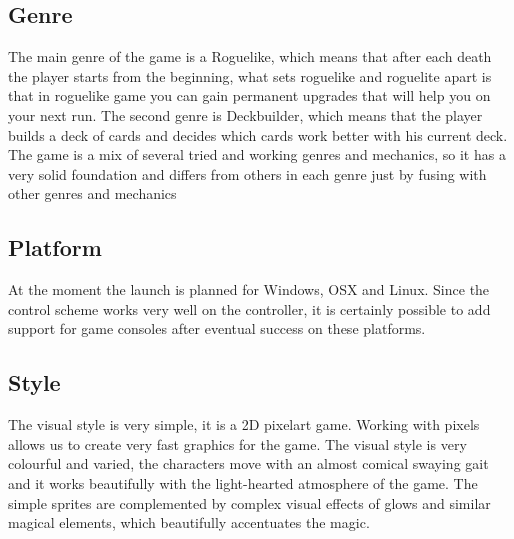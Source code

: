 \documentclass[a4paper,10pt,english]{article}
\begin{document}
\subsection*{Genre}
The main genre of the game is a Roguelike, which means that after each death the player starts from the beginning, what sets roguelike and roguelite apart is that in roguelike game you can gain permanent upgrades that will help you on your next run. \newline
The second genre is Deckbuilder, which means that the player builds a deck of cards and decides which cards work better with his current deck.
The game is a mix of several tried and working genres and mechanics, so it has a very solid foundation and differs from others in each genre just by fusing with other genres and mechanics

\subsection*{Platform}
At the moment the launch is planned for Windows, OSX and Linux. Since the control scheme works very well on the controller, it is certainly possible to add support for game consoles after eventual success on these platforms.

\subsection*{Style}
The visual style is very simple, it is a 2D pixelart game. Working with pixels allows us to create very fast graphics for the game. The visual style is very colourful and varied, the characters move with an almost comical swaying gait and it works beautifully with the light-hearted atmosphere of the game. The simple sprites are complemented by complex visual effects of glows and similar magical elements, which beautifully accentuates the magic.
\end{document}
